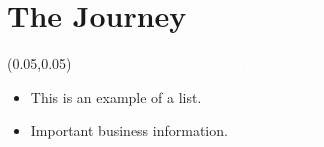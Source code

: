 \documentclass[aspectratio=169]{beamer} %
\begin{document}

\section{The Journey}

\begin{frame}{}
    \setlength{\TPHorizModule}{\textwidth}
    \setlength{\TPVertModule}{\textwidth}
    \begin{textblock}{0.74} (0.05,0.05)
        \bfseries\large\textcolor{white}{What Have I Gotten Myself Into?}
    \end{textblock}
    \begin{itemize}
        \item This is an example of a list.
        \item Important business information.
    \end{itemize}
\end{frame}
\end{document}
